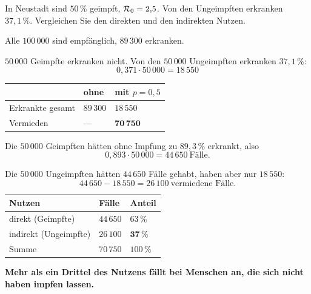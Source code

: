 \begin{aufgabe}
In Neustadt sind $50\,\%$ geimpft, $\mathcal{R}_0 = 2{,}5$. Von den Ungeimpften erkranken $37{,}1\,\%$. Vergleichen Sie den direkten und den indirekten Nutzen.

\loesung
{}
Alle $100\,000$ sind empfänglich, $89\,300$ erkranken.

$50\,000$ Geimpfte erkranken nicht. Von den $50\,000$ Ungeimpften erkranken $37{,}1\,\%$:
\[ 0{,}371 \cdot 50\,000 = 18\,550 \]

\begin{center}
\renewcommand{\arraystretch}{1.48}
\begin{tabular}{@{}P{3.0cm}P{2.2cm}P{2.4cm}@{}}
\toprule
& \textbf{ohne} & \textbf{mit $p=0{,}5$}\\
\midrule
Erkrankte gesamt & $89\,300$ & $18\,550$\\
Vermieden & --- & $\mathbf{70\,750}$\\
\bottomrule
\end{tabular}
\end{center}

 Die $50\,000$ Geimpften hätten ohne Impfung zu $89{,}3\,\%$ erkrankt, also
\[ 0{,}893 \cdot 50\,000 = 44\,650 \ \text{Fälle} . \]

 Die $50\,000$ Ungeimpften hätten $44\,650$ Fälle gehabt, haben aber nur $18\,550$:
\[ 44\,650 - 18\,550 = 26\,100 \ \text{vermiedene Fälle} . \]

\begin{center}
\renewcommand{\arraystretch}{1.48}
\begin{tabular}{@{}P{3.0cm}P{2.2cm}P{2.4cm}@{}}
\toprule
\textbf{Nutzen} & \textbf{Fälle} & \textbf{Anteil}\\
\midrule
direkt (Geimpfte) & $44\,650$ & $63\,\%$\\
indirekt (Ungeimpfte) & $26\,100$ & $\mathbf{37\,\%}$\\
\midrule
Summe & $70\,750$ & $100\,\%$\\
\bottomrule
\end{tabular}
\end{center}

\begin{center}
\begin{minipage}{0.9\textwidth}
\textbf{Mehr als ein Drittel des Nutzens fällt bei Menschen an, die sich nicht haben impfen lassen.}
\end{minipage}
\end{center}


\end{aufgabe}

